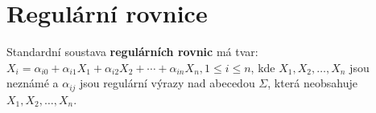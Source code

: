 \documentclass{szzclass}
\begin{document}
\section{Regulární rovnice}
\begin{definition}
Standardní soustava \textbf{regulárních rovnic} má tvar:
$X_i = \alpha_{i0} + \alpha_{i1}X_1 + \alpha_{i2}X_2 + \cdots + \alpha_{in}X_n, 1 \leq i \leq n$, kde $X_1, X_2, \dots , X_n$ jsou neznámé a $\alpha_{ij}$ jsou regulární výrazy nad abecedou $\Sigma$, která neobsahuje $X_1, X_2, \dots , X_n$.
\end{definition}
\end{document}
